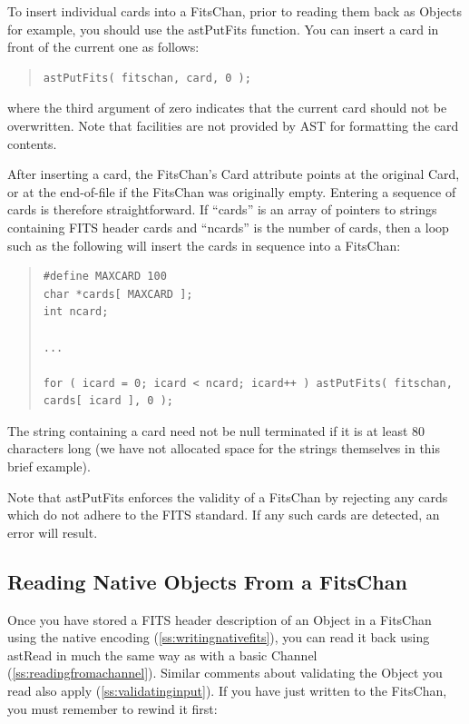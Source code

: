 \documentclass[twoside,11pt]{article}
\newcommand{\htmlref}[2]{#1}
\newcommand{\secref}[1]{\S\ref{#1}}
\renewcommand{\secref}[1]{\ref{#1}}
\begin{document}
To insert individual cards into a \htmlref{FitsChan}{FitsChan}, prior to reading them back
as Objects for example, you should use the \htmlref{astPutFits}{astPutFits} function. You
can insert a card in front of the current one as follows:

\begin{quote}
\small
\begin{verbatim}
astPutFits( fitschan, card, 0 );
\end{verbatim}
\normalsize
\end{quote}

where the third argument of zero indicates that the current card
should not be overwritten. Note that facilities are not provided by
AST for formatting the card contents.

After inserting a card, the FitsChan's \htmlref{Card}{Card} attribute points at the
original Card, or at the end-of-file if the FitsChan was originally
empty. Entering a sequence of cards is therefore straightforward. If
``cards'' is an array of pointers to strings containing FITS header
cards and ``ncards'' is the number of cards, then a loop such as the
following will insert the cards in sequence into a FitsChan:

\begin{quote}
\small
\begin{verbatim}
#define MAXCARD 100
char *cards[ MAXCARD ];
int ncard;

...

for ( icard = 0; icard < ncard; icard++ ) astPutFits( fitschan, cards[ icard ], 0 );
\end{verbatim}
\normalsize
\end{quote}

The string containing a card need not be null terminated if it is at
least 80 characters long (we have not allocated space for the strings
themselves in this brief example).

Note that astPutFits enforces the validity of a FitsChan by rejecting
any cards which do not adhere to the FITS standard. If any such cards
are detected, an error will result.

\subsection{\label{ss:readingnativefits}Reading Native Objects From a FitsChan}

Once you have stored a FITS header description of an \htmlref{Object}{Object} in a
\htmlref{FitsChan}{FitsChan} using the native encoding (\secref{ss:writingnativefits}),
you can read it back using \htmlref{astRead}{astRead} in much the same way as with a
basic \htmlref{Channel}{Channel} (\secref{ss:readingfromachannel}). Similar comments
about validating the Object you read also apply
(\secref{ss:validatinginput}).  If you have just written to the
FitsChan, you must remember to rewind it first:
\end{document}

